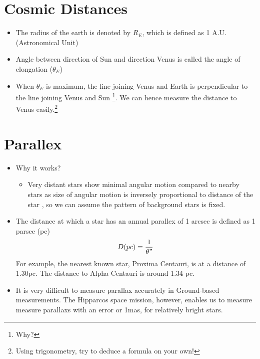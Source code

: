 \documentclass{article}
\begin{document}
\section{Cosmic Distances}
\begin{itemize}

\item The radius of the earth is denoted by $R_E$, which is defined as 1 A.U. (Astronomical Unit)

\item Angle between direction of Sun and direction Venus is called the angle of elongation ($\theta_E$)

\item When $\theta_E$ is maximum, the line joining Venus and Earth is perpendicular to the line joining Venus and Sun \footnote{Why?}. We can hence measure the distance to Venus easily.\footnote{Using trigonometry, try to deduce a formula on your own!}
\end{itemize}
\section{Parallex}
\begin{itemize}
\item Why it works?
\begin{itemize}
\item Very distant stars show minimal angular motion compared to nearby stars as size of angular motion is inversely proportional to distance of the star , so we can assume the pattern of
 background stars is fixed.
\end{itemize}
\item The distance at which a star has an annual parallex of 1 arcsec is defined as 1 parsec (pc)
\begin{equation}
D(pc)=\frac{1}{\theta"}
\end{equation}
For example, the nearest known star, Proxima Centauri, is at a distance of 1.30pc. The distance to Alpha Centauri is around 1.34 pc. 
\item It is very difficult to measure parallax accurately in Ground-based measurements. The Hipparcos space mission, however, enables us to measure measure parallaxs with an error or 1mas, for relatively bright stars.
\end{itemize}
\end{document}
